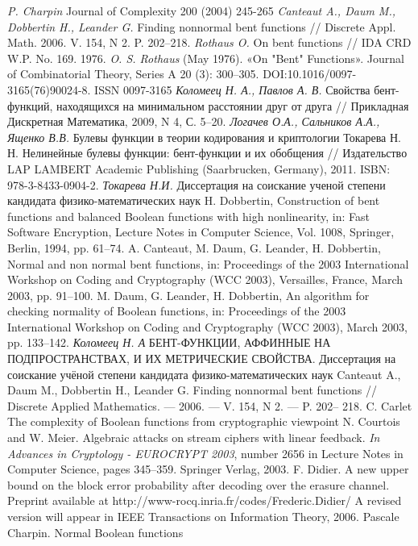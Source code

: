 \begin{thebibliography}{99}
 {\it P. Charpin} Journal of Complexity 200 (2004) 245-265
 {\it Canteaut A., Daum M., Dobbertin H., Leander G.} Finding nonnormal bent
functions // Discrete Appl. Math. 2006. V. 154, N 2. P. 202–218.
 {\it Rothaus O.} On bent functions // IDA CRD W.P. No. 169. 1976.
  {\it O. S. Rothaus} (May 1976). «On "Bent" Functions». Journal of Combinatorial Theory, Series A 20 (3): 300–305. DOI:10.1016/0097-3165(76)90024-8. ISSN 0097-3165
 {\it Коломеец Н. А., Павлов А. В.} Свойства бент-функций, находящихся
на минимальном расстоянии друг от друга // Прикладная Дискретная
Математика, 2009, N 4, С. 5–20.
 {\it Логачев О.А., Сальников А.А., Ященко В.В.} Булевы функции в теории кодирования и криптологии
Токарева Н. Н. Нелинейные булевы функции: бент-функции и их обобщения // Издательство LAP
LAMBERT Academic Publishing (Saarbrucken, Germany), 2011. ISBN: 978-3-8433-0904-2.
 {\it Токарева Н.И.} Диссертация на соискание ученой степени
кандидата физико-математических наук
 H. Dobbertin, Construction of bent functions and balanced Boolean functions with high
nonlinearity, in: Fast Software Encryption, Lecture Notes in Computer Science, Vol. 1008, Springer,
Berlin, 1994, pp. 61–74.
A. Canteaut, M. Daum, G. Leander, H. Dobbertin, Normal and non normal bent functions, in:
Proceedings of the 2003 International Workshop on Coding and Cryptography (WCC 2003),
Versailles, France, March 2003, pp. 91–100.
 M. Daum, G. Leander, H. Dobbertin, An algorithm for checking normality of Boolean functions, in:
Proceedings of the 2003 International Workshop on Coding and Cryptography (WCC 2003), March
2003, pp. 133–142.
 {\it Коломеец Н. А} БЕНТ-ФУНКЦИИ, АФФИННЫЕ НА ПОДПРОСТРАНСТВАХ, И ИХ
МЕТРИЧЕСКИЕ СВОЙСТВА. Диссертация на соискание учёной степени
кандидата физико-математических наук
 Canteaut A., Daum M., Dobbertin H., Leander G. Finding nonnormal bent
functions // Discrete Applied Mathematics. — 2006. — V. 154, N 2. — P. 202–
218.
 C. Carlet The complexity of Boolean functions from cryptographic viewpoint
N. Courtois and W. Meier. Algebraic attacks on stream ciphers with linear feedback. {\it In Advances in Cryptology - EUROCRYPT 2003}, number 2656 in Lecture Notes in Computer Science, pages 345–359. Springer Verlag,  2003.
 F. Didier. A new upper bound on the block error probability after decoding over the erasure channel. Preprint available at http://www-rocq.inria.fr/codes/Frederic.Didier/ A revised version will appear in IEEE Transactions on Information Theory, 2006.
 Pascale Charpin. Normal Boolean functions





\end{thebibliography}
